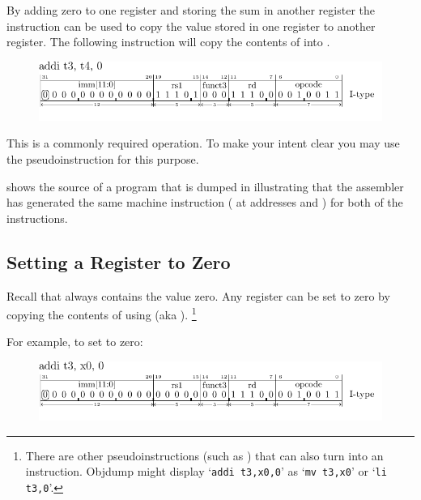 By adding zero to one register and storing the sum in another register
the  instruction can be used to copy the value stored in one
register to another register.  The following instruction will copy
the contents of  into .

\begin{figure}[H]
    \includegraphics{figures/chapter04/IType-addi_t3_t4_0.pdf}
\end{figure}

This is a commonly required operation.  To make your intent clear
you may use the  pseudoinstruction for this purpose.

 shows the source of a program that is dumped in
 illustrating that the assembler has generated the
same machine instruction ( at addresses  and )
for both of the instructions.



\subsection{Setting a Register to Zero}

Recall that  always contains the value zero.  Any register
can be set to zero by copying the contents of  using 
(aka ).%
\footnote{There are other pseudoinstructions (such as ) that can also
turn into an  instruction.  Objdump might display `{\tt addi t3,x0,0}'
as `{\tt mv t3,x0}' or `{\tt li t3,0}'.}

For example, to set  to zero:

\begin{figure}[H]
    \includegraphics{figures/chapter04/IType_addi_t3_x0_0.pdf}
\end{figure}

